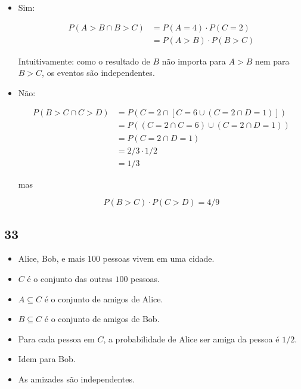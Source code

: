 \documentclass[
  11pt]{report}
\begin{document}
\begin{itemize}
\item
  Sim:

  \[
  \begin{aligned}
  P(A > B \cap B > C) &= P(A = 4) \cdot P(C = 2) \\
  &= P(A > B) \cdot P(B > C)
  \end{aligned}
  \]

  Intuitivamente: como o resultado de $B$ não importa para $A > B$ nem para $B > C$, os eventos são independentes.
\item
  Não:

  \[
  \begin{aligned}
    P(B > C \cap C > D) 
    &= P(C = 2 \cap [C = 6 \cup (C = 2 \cap D = 1)]) \\
    &= P((C = 2 \cap C = 6) \cup (C = 2 \cap D = 1)) \\
    &= P(C = 2 \cap D = 1) \\
    &= 2/3 \cdot 1/2 \\
    &= 1/3
  \end{aligned}
  \]

  mas

  \[
  P(B > C) \cdot P(C > D) = 4/9
  \]
\end{itemize}

\hypertarget{amigos}{%
\subsection*{33}\label{amigos}}

\begin{rmdbox}

\begin{itemize}
\item
  Alice, Bob, e mais $100$ pessoas vivem em uma cidade.
\item
  $C$ é o conjunto das outras $100$ pessoas.
\item
  $A \subseteq C$ é o conjunto de amigos de Alice.
\item
  $B \subseteq C$ é o conjunto de amigos de Bob.
\item
  Para cada pessoa em $C$, a probabilidade de Alice ser amiga da pessoa é $1/2$.
\item
  Idem para Bob.
\item
  As amizades são independentes.
\end{itemize}

\end{rmdbox}
\end{document}
